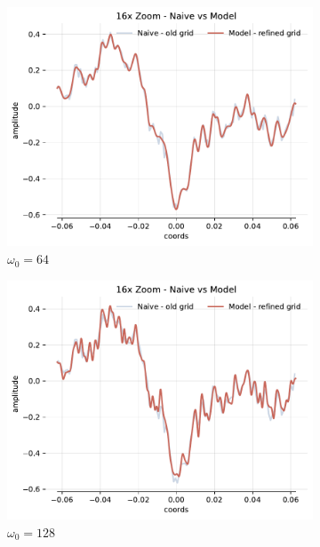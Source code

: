 \begin{figure}[h]
    \begin{subfigure}[b]{0.32\textwidth}
        \centering
        \includegraphics[width=\textwidth]{img/ch3/16x-zoom-1hl-32hf-64hz.pdf}
        \caption{$\omega_0=64$}
        \label{fig:16x-zoom-1hl-32hf-64hz}
    \end{subfigure}
    \begin{subfigure}[b]{0.32\textwidth}
        \centering
        \includegraphics[width=\textwidth]{img/ch3/16x-zoom-1hl-32hf-128hz.pdf}
        \caption{$\omega_0=128$}
        \label{fig:16x-zoom-1hl-32hf-128hz}
    \end{subfigure}
    \begin{subfigure}[b]{0.32\textwidth}

\end{subfigure}
\end{figure}

